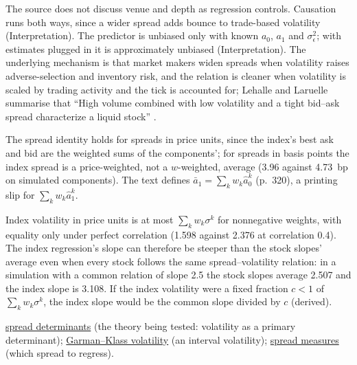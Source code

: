 \begin{qfmethod}
The source does not discuss venue and depth as regression controls. Causation runs both ways, since a wider spread adds bounce to trade-based volatility (Interpretation). The predictor is unbiased only with known $a_0$, $a_1$ and $\sigma_\epsilon^2$; with estimates plugged in it is approximately unbiased (Interpretation). The underlying mechanism is that market makers widen spreads when volatility raises adverse-selection and inventory risk, and the relation is cleaner when volatility is scaled by trading activity and the tick is accounted for; Lehalle and Laruelle summarise that ``High volume combined with low volatility and a tight bid--ask spread characterize a liquid stock'' \citep[chap.~2, sec.~2.3, p.~149]{alpha-laruelle}.

The spread identity holds for spreads in price units, since the index's best ask and bid are the weighted sums of the components'; for spreads in basis points the index spread is a price-weighted, not a $w$-weighted, average (3.96 against 4.73~bp on simulated components). The text defines $\bar a_1=\sum_kw_k\hat a^k_0$ (p.~320), a printing slip for $\sum_kw_k\hat a^k_1$.

Index volatility in price units is at most $\sum_kw_k\sigma^k$ for nonnegative weights, with equality only under perfect correlation (1.598 against 2.376 at correlation 0.4). The index regression's slope can therefore be steeper than the stock slopes' average even when every stock follows the same spread--volatility relation: in a simulation with a common relation of slope 2.5 the stock slopes average 2.507 and the index slope is 3.108. If the index volatility were a fixed fraction $c<1$ of $\sum_kw_k\sigma^k$, the index slope would be the common slope divided by $c$ (derived).

 \hyperref[res:spread-determinants]{spread determinants} (the theory being tested: volatility as a primary determinant); \hyperref[meth:garman-klass-volatility]{Garman--Klass volatility} (an interval volatility); \hyperref[def:spread-measures]{spread measures} (which spread to regress).

\end{qfmethod}

